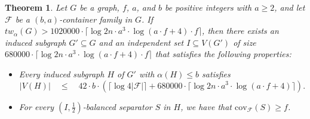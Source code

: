 \documentclass[11pt]{amsart}
\newtheorem{theorem}{Theorem}[section]
\newcommand{\atw}{tw_{\alpha}\xspace}
\begin{document}
\begin{theorem}\label{thm:tw_and_talpha}
    Let $G$ be a graph, $f$, $a$, and $b$ be positive integers with $a \geq 2$, and let $\mathcal{F}$ be a $(b, a)$-container family in $G$. If $\atw(G) > 1020000 \cdot \lceil \log 2n \cdot a^3 \cdot {\log(a\cdot f + 4)} \cdot f \rceil$, then there exists an induced subgraph $G' \subseteq G$ and an independent set $I \subseteq V(G')$ of size $680000 \cdot \lceil \log 2n \cdot a^3 \cdot {\log(a\cdot f + 4)} \cdot f \rceil$ that satisfies the following properties:
    \begin{itemize}
        \item Every induced subgraph $H$ of $G'$ with $\alpha(H)\leq b$ satisfies
        $$|V(H)| \quad \leq \quad {42} \cdot b \cdot (\lceil\log 4|\mathcal{F}|\rceil + 680000 \cdot \lceil \log 2n \cdot a^3 \cdot {\log(a\cdot f + 4)}\rceil).$$
        \item For every $(I,\frac{1}{2})$-balanced separator $S$ in $H$, we have that $\mathrm{cov}_{\mathcal{F}}(S) \geq f$.
    \end{itemize}
\end{theorem}
\end{document}
